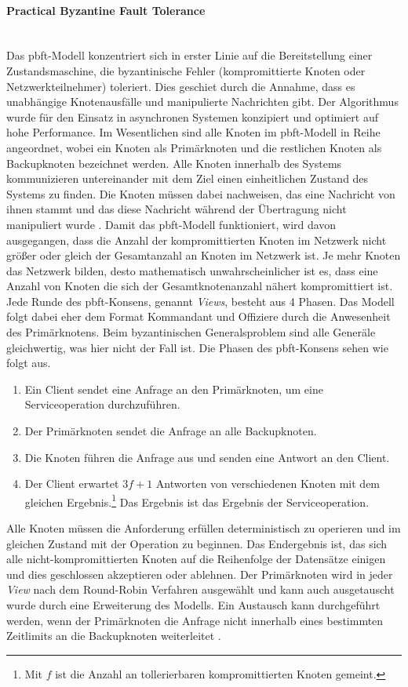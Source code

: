 \paragraph{Practical Byzantine Fault Tolerance}$~~$\\
Das \ac{pbft}-Modell konzentriert sich in erster Linie auf die Bereitstellung einer Zustandsmaschine, die byzantinische Fehler (kompromittierte Knoten oder Netzwerkteilnehmer) toleriert. Dies geschiet durch die Annahme, dass es unabhängige Knotenausfälle und manipulierte Nachrichten gibt. Der Algorithmus wurde für den Einsatz in asynchronen Systemen konzipiert und optimiert auf hohe Performance. Im Wesentlichen sind alle Knoten im \ac{pbft}-Modell in Reihe angeordnet, wobei ein Knoten als Primärknoten und die restlichen Knoten als Backupknoten bezeichnet werden. Alle Knoten innerhalb des Systems kommunizieren untereinander mit dem Ziel einen einheitlichen Zustand des Systems zu finden. Die Knoten müssen dabei nachweisen, das eine Nachricht von ihnen stammt und das diese Nachricht während der Übertragung nicht manipuliert wurde \citep{Tuan2017}. Damit das \ac{pbft}-Modell funktioniert, wird davon ausgegangen, dass die Anzahl der kompromittierten Knoten im Netzwerk nicht größer oder gleich  der Gesamtanzahl an Knoten im Netzwerk ist. Je mehr Knoten das Netzwerk bilden, desto mathematisch unwahrscheinlicher ist es, dass eine Anzahl von Knoten die sich  der Gesamtknotenanzahl nähert kompromittiert ist. Jede Runde des \ac{pbft}-Konsens, genannt \textit{Views}, besteht aus 4 Phasen. Das Modell folgt dabei eher dem Format \glqq Kommandant und Offiziere\grqq{} durch die Anwesenheit des Primärknotens. Beim byzantinischen Generalsproblem sind alle Generäle gleichwertig, was hier nicht der Fall ist. Die Phasen des \ac{pbft}-Konsens sehen wie folgt aus.

\begin{enumerate}
	\item Ein Client sendet eine Anfrage an den Primärknoten, um eine Serviceoperation durchzuführen.
	\item Der Primärknoten sendet die Anfrage an alle Backupknoten.
	\item Die Knoten führen die Anfrage aus und senden eine Antwort an den Client.
	\item Der Client erwartet \(3f + 1\) Antworten von verschiedenen Knoten mit dem gleichen Ergebnis.\footnote{Mit \(f\) ist die Anzahl an tollerierbaren kompromittierten Knoten gemeint.} Das Ergebnis ist das Ergebnis der Serviceoperation.
\end{enumerate}

Alle Knoten müssen die Anforderung erfüllen deterministisch zu operieren und im gleichen Zustand mit der Operation zu beginnen. Das Endergebnis ist, das sich alle nicht-kompromittierten Knoten auf die Reihenfolge der Datensätze einigen und dies geschlossen akzeptieren oder ablehnen. Der Primärknoten wird in jeder \textit{View} nach dem Round-Robin Verfahren ausgewählt und kann auch ausgetauscht wurde durch eine Erweiterung des Modells. Ein Austausch kann durchgeführt werden, wenn der Primärknoten die Anfrage nicht innerhalb eines bestimmten Zeitlimits an die Backupknoten weiterleitet \citep{Castro1999}.
